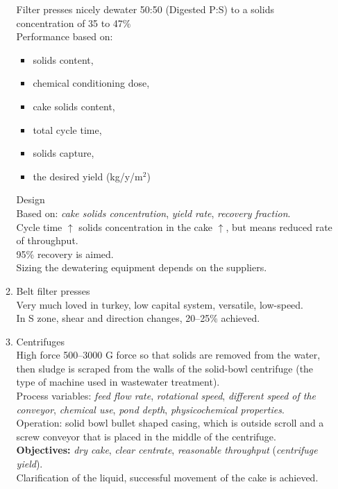 \documentclass{article}
\numberwithin{equation}{section}
\begin{document}
\begin{enumerate}
\begin{enumerate}
        Filter presses nicely dewater 50:50 (Digested P:S) to a solids concentration of 35 to 47\%\\
        Performance based on:
        \begin{itemize}
            \item solids content,
            \item chemical conditioning dose,
            \item cake solids content,
            \item total cycle time,
            \item solids capture,
            \item the desired yield (kg/y/m$^2$)
        \end{itemize}
        Design\\
        Based on: \emph{cake solids concentration}, \emph{yield rate}, \emph{recovery fraction}.\\
        Cycle time $\uparrow$ solids concentration in the cake $\uparrow$, but means reduced rate of throughput.\\
        95\% recovery is aimed.\\
        Sizing the dewatering equipment depends on the suppliers.
        \item Belt filter presses\\
        Very much loved in turkey, low capital system, versatile, low-speed.\\
        In S zone, shear and direction changes, 20--25\% achieved.
        \item Centrifuges\\
        High force 500--3000 G force so that solids are removed from the water, then sludge is scraped from the walls of the solid-bowl centrifuge (the type of machine used in wastewater treatment).\\
        Process variables: \emph{feed flow rate}, \emph{rotational speed}, \emph{different speed of the conveyor}, \emph{chemical use}, \emph{pond depth}, \emph{physicochemical properties}.\\
        Operation: solid bowl bullet shaped casing, which is outside scroll and a screw conveyor that is placed in the middle of the centrifuge.\\
        \textbf{Objectives:} \emph{dry cake}, \emph{clear centrate}, \emph{reasonable throughput} (\emph{centrifuge yield}).\\
        Clarification of the liquid, successful movement of the cake is achieved.\\

\end{enumerate}
\end{enumerate}
\end{document}
